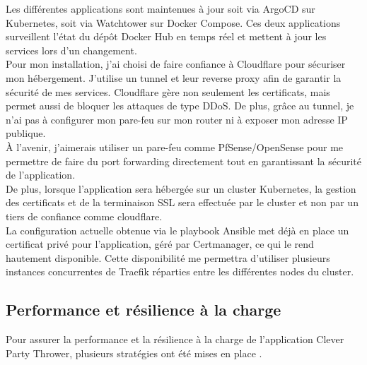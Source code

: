 Les différentes applications sont maintenues à jour soit via ArgoCD sur Kubernetes, soit via Watchtower sur Docker Compose.
Ces deux applications surveillent l'état du dépôt Docker Hub en temps réel et mettent à jour les services lors d'un changement.\\

Pour mon installation, j'ai choisi de faire confiance à Cloudflare pour sécuriser mon hébergement.
J'utilise un tunnel et leur reverse proxy afin de garantir la sécurité de mes services.
Cloudflare gère non seulement les certificats, mais permet aussi de bloquer les attaques de type DDoS. De plus, grâce au tunnel,
je n'ai pas à configurer mon pare-feu sur mon router ni à exposer mon adresse IP publique.\\

À l'avenir, j'aimerais utiliser un pare-feu comme PfSense/OpenSense pour me permettre de faire du port forwarding directement
tout en garantissant la sécurité de l'application.\\

De plus, lorsque l'application sera hébergée sur un cluster Kubernetes, la gestion des certificats et de la terminaison
SSL sera effectuée par le cluster et non par un tiers de confiance comme cloudflare.\\

La configuration actuelle obtenue via le playbook Ansible met déjà en place un certificat privé pour l'application, géré par Certmanager,
ce qui le rend hautement disponible.
Cette disponibilité me permettra d'utiliser plusieurs instances concurrentes de Traefik réparties entre les différentes nodes du cluster.

\subsection{Performance et résilience à la charge}\label{subsec:performance-et-resilience}

Pour assurer la performance et la résilience à la charge de l'application Clever Party Thrower, plusieurs stratégies ont été mises en place .\\

